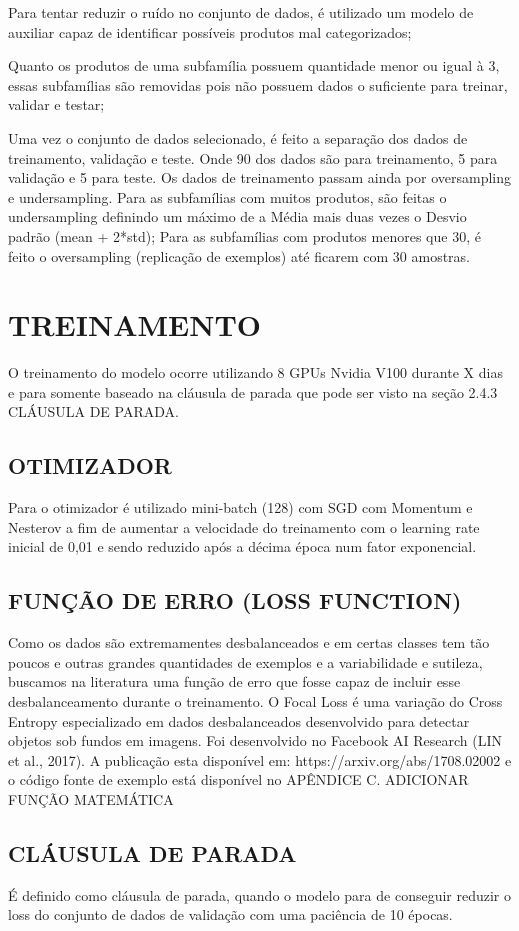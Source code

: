 Para tentar reduzir o ruído no conjunto de dados, é utilizado um modelo de auxiliar capaz de identificar possíveis produtos mal categorizados;

Quanto os produtos de uma subfamília possuem quantidade menor ou igual à 3, essas subfamílias são removidas pois não possuem dados o suficiente para treinar, validar e testar;

Uma vez o conjunto de dados selecionado, é feito a separação dos dados de treinamento, validação e teste. Onde 90 dos dados são para treinamento, 5 para validação e 5 para teste. Os dados de treinamento passam ainda por oversampling e undersampling.
Para as subfamílias com muitos produtos, são feitas o undersampling definindo um máximo de a Média mais duas vezes o Desvio padrão (mean + 2*std);
Para as subfamílias com produtos menores que 30, é feito o oversampling (replicação de exemplos) até ficarem com 30 amostras.

\section{TREINAMENTO}

O treinamento do modelo ocorre utilizando 8 GPUs Nvidia V100 durante X dias e para somente baseado na cláusula de parada que pode ser visto na seção 2.4.3 CLÁUSULA DE PARADA. 

\subsection{OTIMIZADOR}

Para o otimizador é utilizado mini-batch (128) com SGD com Momentum e Nesterov a fim de aumentar a velocidade do treinamento com o learning rate inicial de 0,01 e sendo reduzido após a décima época num fator exponencial.

\subsection{FUNÇÃO DE ERRO (LOSS FUNCTION)}

Como os dados são extremamentes desbalanceados e em certas classes tem tão poucos e outras grandes quantidades de exemplos e a variabilidade e sutileza, buscamos na literatura uma função de erro que fosse capaz de incluir esse desbalanceamento durante o treinamento.
O Focal Loss é uma variação do Cross Entropy especializado em dados desbalanceados desenvolvido para detectar objetos sob fundos em imagens. Foi desenvolvido no Facebook AI Research (LIN et al., 2017). A publicação esta disponível em: https://arxiv.org/abs/1708.02002 e o código fonte de exemplo está disponível no APÊNDICE C.
ADICIONAR FUNÇÃO MATEMÁTICA

\subsection{CLÁUSULA DE PARADA}

É definido como cláusula de parada, quando o modelo para de conseguir reduzir o loss do conjunto de dados de validação com uma paciência de 10 épocas.
